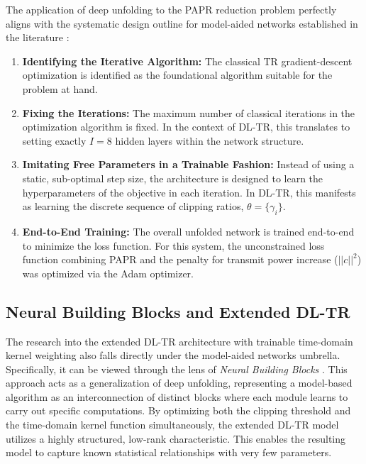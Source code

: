 The application of deep unfolding to the PAPR reduction problem perfectly aligns with the systematic design outline for model-aided networks established in the literature \cite{modelbased}:
\begin{enumerate}
    \item \textbf{Identifying the Iterative Algorithm:} The classical TR gradient-descent optimization is identified as the foundational algorithm suitable for the problem at hand.
    \item \textbf{Fixing the Iterations:} The maximum number of classical iterations in the optimization algorithm is fixed. In the context of DL-TR, this translates to setting exactly $I=8$ hidden layers within the network structure.
    \item \textbf{Imitating Free Parameters in a Trainable Fashion:} Instead of using a static, sub-optimal step size, the architecture is designed to learn the hyperparameters of the objective in each iteration. In DL-TR, this manifests as learning the discrete sequence of clipping ratios, $\theta = \{\gamma_i\}$.
    \item \textbf{End-to-End Training:} The overall unfolded network is trained end-to-end to minimize the loss function. For this system, the unconstrained loss function combining PAPR and the penalty for transmit power increase ($||c||^2$) was optimized via the Adam optimizer.
\end{enumerate}

\subsection{Neural Building Blocks and Extended DL-TR}
The research into the extended DL-TR architecture with trainable time-domain kernel weighting also falls directly under the model-aided networks umbrella. Specifically, it can be viewed through the lens of \textit{Neural Building Blocks} \cite{dl_tr}. This approach acts as a generalization of deep unfolding, representing a model-based algorithm as an interconnection of distinct blocks where each module learns to carry out specific computations. By optimizing both the clipping threshold and the time-domain kernel function simultaneously, the extended DL-TR model utilizes a highly structured, low-rank characteristic. This enables the resulting model to capture known statistical relationships with very few parameters.

